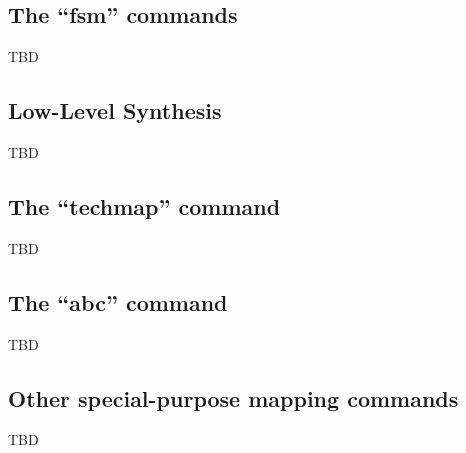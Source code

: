 
\subsection{The ``fsm'' commands}

\begin{frame}{\subsecname}
TBD
\end{frame}


\subsection{Low-Level Synthesis}

\begin{frame}{\subsecname}
TBD
\end{frame}


\subsection{The ``techmap'' command}

\begin{frame}{\subsecname}
TBD
\end{frame}


\subsection{The ``abc'' command}

\begin{frame}{\subsecname}
TBD
\end{frame}


\subsection{Other special-purpose mapping commands}

\begin{frame}{\subsecname}
TBD
\end{frame}


